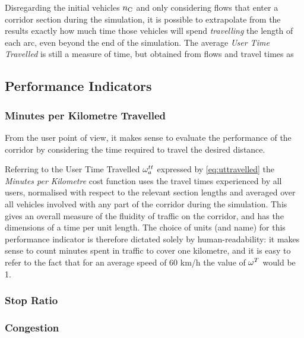 Disregarding the initial vehicles $n_{\mathrm{C}}$ and only considering flows that enter a corridor section during the simulation, it is possible to extrapolate from the results exactly how much time those vehicles will spend \emph{travelling} the length of each arc, even beyond the end of the simulation. The average \emph{User Time Travelled} is still a measure of time, but obtained from flows and travel times as

\subsection{Performance Indicators}

\subsubsection{Minutes per Kilometre Travelled}
From the user point of view, it makes sense to evaluate the performance of the corridor by considering the time required to travel the desired distance.

Referring to the User Time Travelled $\omega_{a}^{tt}$ expressed by \eqref{eq:uttravelled} the \emph{Minutes per Kilometre} cost function
uses the travel times experienced by all users, normalised with respect to the relevant section lengths and averaged over all vehicles involved with any part of the corridor during the simulation. This gives an overall measure of the fluidity of traffic on the corridor, and has the dimensions of a time per unit length. The choice of units (and name) for this performance indicator is therefore dictated solely by human-readability: it makes sense to count minutes spent in traffic to cover one kilometre, and it is easy to refer to the fact that for an average speed of 60 km/h the value of $\omega_{}^{T}$ would be 1.

\subsubsection{Stop Ratio}


\subsubsection{Congestion}



